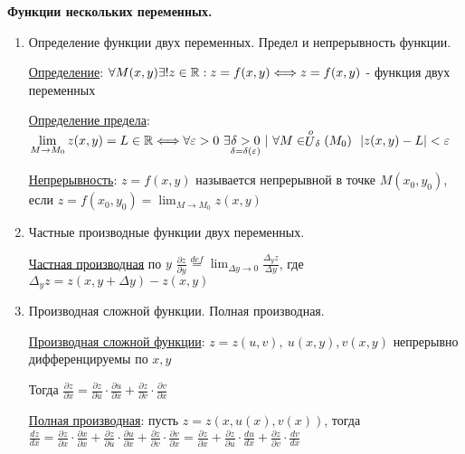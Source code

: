 \documentclass[12pt]{article}
\begin{document}
    \begin{center}
        \textbf{Функции нескольких переменных.}
    \end{center}

    \begin{enumerate}
        \item Определение функции двух переменных. Предел и непрерывность функции.

        \hyperlink{functionoftwovariables}{Определение}: $\forall M(x, y) \exists! z \in \mathbb{R} : z = f(x, y) \Longleftrightarrow z = f(x, y)$ - функция двух переменных

        \hyperlink{limitoffunctionoftwovariables}{Определение предела}: $\displaystyle \lim_{M \to M_0} z(x, y) = L \in \mathbb{R} \Longleftrightarrow \forall \varepsilon > 0 \ \exists \underset{\delta = \delta(\varepsilon)}{\delta > 0} \ | \ \forall M \in \stackrel{o}{U}_\delta(M_0) \ \ |z(x, y) - L| < \varepsilon$

        \hyperlink{continuityoffunctionoftwovariables}{Непрерывность}: $z = f(x, y)$ называется непрерывной в точке $M(x_0, y_0)$, если $z = f(x_0, y_0) = \lim_{M \to M_0} z(x, y)$

        \item Частные производные функции двух переменных.

        \hyperlink{partialderivativeoffunctionoftwovariables}{Частная производная} по $y$ $\displaystyle \frac{\partial z}{\partial y} \stackrel{def}{=} \lim_{\Delta y \to 0} \frac{\Delta_y z}{\Delta y}$,
        где $\Delta_y z = z(x, y + \Delta y) - z(x, y)$

        \item Производная сложной функции. Полная производная.

        \hyperlink{derivativeofcomplexfunctionoftwovariables}{Производная сложной функции}: $\displaystyle z = z(u, v), \ u(x, y), v(x, y)$ непрерывно дифференцируемы по $\displaystyle x, y$

        Тогда $\displaystyle \frac{\partial z}{\partial x} = \frac{\partial z}{\partial u} \cdot \frac{\partial u}{\partial x} + \frac{\partial z}{\partial v} \cdot \frac{\partial v}{\partial x}$

        \hyperlink{completedifferentialoffunctionoftwovariables}{Полная производная}: пусть $\displaystyle z = z(x, u(x), v(x))$,
        тогда $\displaystyle \frac{dz}{dx} = \frac{\partial z}{\partial x} \cdot \frac{\partial x}{\partial x} + \frac{\partial z}{\partial u} \cdot \frac{\partial u}{\partial x} + \frac{\partial z}{\partial v} \cdot \frac{\partial v}{\partial x} =
        \frac{\partial z}{\partial x} + \frac{\partial z}{\partial u} \cdot \frac{du}{dx} + \frac{\partial z}{\partial v} \cdot \frac{dv}{dx}$


\end{enumerate}
\end{document}
